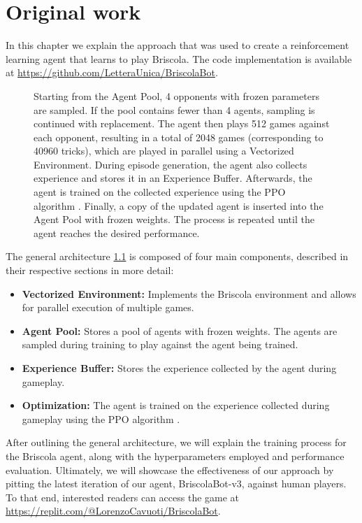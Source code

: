 \chapter{Original work}

In this chapter we explain the approach that was used to create a reinforcement learning agent that learns to play Briscola. The code implementation is available at \url{https://github.com/LetteraUnica/BriscolaBot}.

\begin{figure}[H]
    \centering
    
    \caption{Starting from the Agent Pool, 4 opponents with frozen parameters are sampled. If the pool contains fewer than 4 agents, sampling is continued with replacement. The agent then plays 512 games against each opponent, resulting in a total of 2048 games (corresponding to 40960 tricks), which are played in parallel using a Vectorized Environment. During episode generation, the agent also collects experience and stores it in an Experience Buffer. Afterwards, the agent is trained on the collected experience using the PPO algorithm \cite{schulman2017proximal}. Finally, a copy of the updated agent is inserted into the Agent Pool with frozen weights. The process is repeated until the agent reaches the desired performance.}
    \label{fig:general-architecture}
\end{figure}
The general architecture \ref{fig:general-architecture} is composed of four main components, described in their respective sections in more detail:
\begin{itemize}
    \item \textbf{Vectorized Environment:} Implements the Briscola environment and allows for parallel execution of multiple games.
    \item \textbf{Agent Pool:} Stores a pool of agents with frozen weights. The agents are sampled during training to play against the agent being trained.
    \item \textbf{Experience Buffer:} Stores the experience collected by the agent during gameplay.
    \item \textbf{Optimization:} The agent is trained on the experience collected during gameplay using the PPO algorithm \cite{schulman2017proximal}.
\end{itemize}
After outlining the general architecture, we will explain the training process for the Briscola agent, along with the hyperparameters employed and performance evaluation. Ultimately, we will showcase the effectiveness of our approach by pitting the latest iteration of our agent, BriscolaBot-v3, against human players. To that end, interested readers can access the game at \url{https://replit.com/@LorenzoCavuoti/BriscolaBot}.

